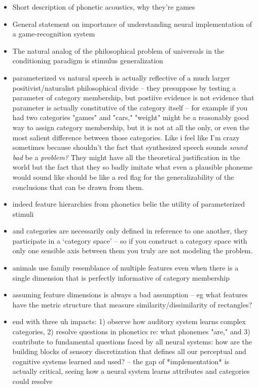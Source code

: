 \begin{multicols}{2}
\begin{itemize}
	\item Short description of phonetic acoustics, why they're games
	\item General statement on importance of understanding neural implementation of a game-recognition system
	\item The natural analog of the philosophical problem of universals in the conditioning paradigm is stimulus generalization \cite{roschWittgensteinCategorizationResearch1987}
	\item parameterized vs natural speech is actually reflective of a much larger positivist/naturalist philosophical divide -- they presuppose by testing a parameter of category membership, but postiive evidence is not evidence that parameter is actually constitutive of the category itself -- for example if you had two categories "games" and "cars," "weight" might be a reasonably good way to assign category membership, but it is not at all the only, or even the most salient difference between those categories. Like i feel like I'm crazy sometimes because shouldn't the fact that synthesized speech sounds \textit{sound bad} be a \textit{problem?} They might have all the theoretical justification in the world but the fact that they so badly imitate what even a plausible phoneme would sound like should be like a red flag for the generalizability of the conclusions that can be drawn from them.
	\item indeed feature hierarchies from phonetics belie the utility of parameterized stimuli
	\item and categories are necessarily only defined in reference to one another, they participate in a `category space' -- so if you construct a category space with only one sensible axis between them you truly are not modeling the problem.
	\item animals use family resemblance of multiple features even when there is a single dimension that is perfectly informative of category membership \cite{leaUseMultipleDimensions2008, couchmanRulesResemblanceTheir2010}
	\item assuming feature dimensions is always a bad assumption -- eg what features have the metric structure that measure similarity/dissimilarity of rectangles? \cite{krantzSimilarityRectanglesAnalysis1975a}
	\item end with three uh impacts: 1) observe how auditory system learns complex categories, 2) resolve questions in phonetics re: what phonemes "are," and 3) contribute to fundamental questions faced by all neural systems: how are the building blocks of sensory discretization that defines all our perceptual and cognitive systems learned and used? -- the gap of *implementation* is actually critical, seeing how a neural system learns attributes and categories could resolve 


\end{itemize}
\end{multicols}
